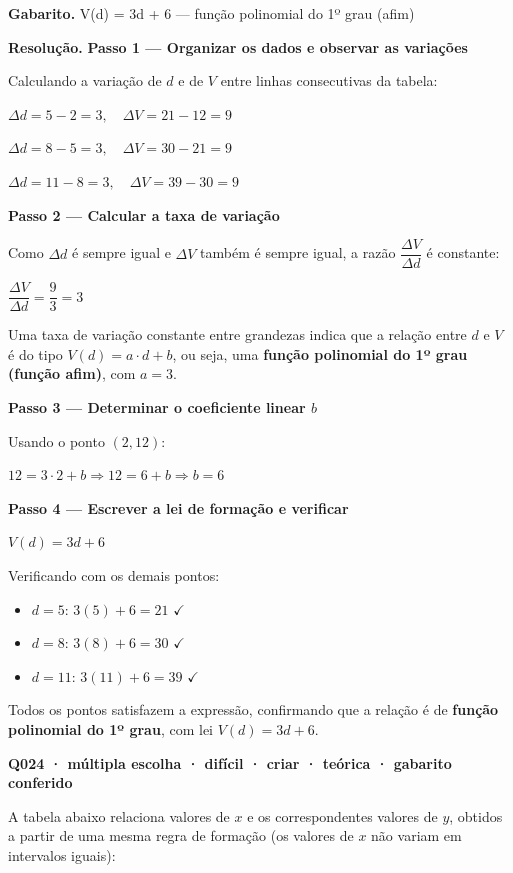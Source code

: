 \documentclass[11pt,a4paper]{article}
\begin{document}
\textbf{Gabarito.} V(d) = 3d + 6 — função polinomial do 1º grau (afim)

\textbf{Resolução.} \textbf{Passo 1 — Organizar os dados e observar as variações}

Calculando a variação de $d$ e de $V$ entre linhas consecutivas da tabela:

$\Delta d = 5-2 = 3,\quad \Delta V = 21-12 = 9$

$\Delta d = 8-5 = 3,\quad \Delta V = 30-21 = 9$

$\Delta d = 11-8 = 3,\quad \Delta V = 39-30 = 9$

\textbf{Passo 2 — Calcular a taxa de variação}

Como $\Delta d$ é sempre igual e $\Delta V$ também é sempre igual, a razão $\dfrac{\Delta V}{\Delta d}$ é constante:

$\dfrac{\Delta V}{\Delta d} = \dfrac{9}{3} = 3$

Uma taxa de variação constante entre grandezas indica que a relação entre $d$ e $V$ é do tipo $V(d) = a\cdot d + b$, ou seja, uma \textbf{função polinomial do 1º grau (função afim)}, com $a = 3$.

\textbf{Passo 3 — Determinar o coeficiente linear $b$}

Usando o ponto $(2,12)$:

$12 = 3\cdot 2 + b \Rightarrow 12 = 6 + b \Rightarrow b = 6$

\textbf{Passo 4 — Escrever a lei de formação e verificar}

$V(d) = 3d + 6$

Verificando com os demais pontos:

\begin{itemize}[nosep,leftmargin=*]
\item $d=5$: $3(5)+6=21$ $\checkmark$
\item $d=8$: $3(8)+6=30$ $\checkmark$
\item $d=11$: $3(11)+6=39$ $\checkmark$
\end{itemize}

Todos os pontos satisfazem a expressão, confirmando que a relação é de \textbf{função polinomial do 1º grau}, com lei $V(d) = 3d + 6$.

\bigskip\noindent\textbf{Q024 · múltipla escolha · difícil · criar · teórica · gabarito conferido}\par\nopagebreak
A tabela abaixo relaciona valores de $x$ e os correspondentes valores de $y$, obtidos a partir de uma mesma regra de formação (os valores de $x$ não variam em intervalos iguais):
\end{document}
